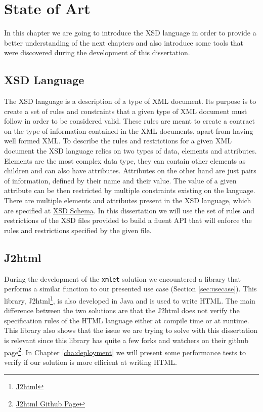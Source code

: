 \chapter{State of Art}
\label{cha:stateofart}

In this chapter we are going to introduce the \ac{XSD} language in order to provide a better understanding of the next chapters and also introduce some tools that were discovered during the development of this dissertation. 

\section{XSD Language} %
\label{sec:xsd}

The \ac{XSD} language is a description of a type of \ac{XML} document. Its purpose is to create a set of rules and constraints that a given type of \ac{XML} document must follow in order to be considered valid. These rules are meant to create a contract on the type of information contained in the \ac{XML} documents, apart from having well formed \ac{XML}. To describe the rules and restrictions for a given \ac{XML} document the \ac{XSD} language relies on two types of data, elements and attributes. Elements are the most complex data type, they can contain other elements as children and can also have attributes. Attributes on the other hand are just pairs of information, defined by their name and their value. The value of a given attribute can be then restricted by multiple constraints existing on the language. There are multiple elements and attributes present in the \ac{XSD} language, which are specified at \href{http://www.datypic.com/sc/xsd/s-xmlschema.xsd.html}{XSD Schema}. In this dissertation we will use the set of rules and restrictions of the \ac{XSD} files provided to build a fluent \ac{API} that will enforce the rules and restrictions specified by the given file.

\section{J2html} %
\label{sec:j2html}

During the development of the \texttt{xmlet} solution we encountered a library that performs a similar function to our presented use case (Section \ref{sec:usecase}). This library, J2html\footnote{\href{https://j2html.com/}{J2html}}, is also developed in Java and is used to write \ac{HTML}. The main difference between the two solutions are that the J2html does not verify the specification rules of the \ac{HTML} language either at compile time or at runtime. This library also shows that the issue we are trying to solve with this dissertation is relevant since this library has quite a few forks and watchers on their github page\footnote{\href{https://github.com/tipsy/j2html}{J2html Github Page}}. In Chapter \ref{cha:deployment} we will present some performance tests to verify if our solution is more efficient at writing \ac{HTML}. 

